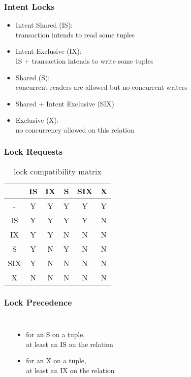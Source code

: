 \documentclass[dvipsnames]{beamer}
\theoremstyle{plain}
\begin{document}
\begin{frame}
  \frametitle{Intent Locks}

  \begin{itemize}
    \item Intent Shared (IS):\\
      transaction intends to read some tuples

    \item Intent Exclusive (IX):\\
      IS + transaction intends to write some tuples

    \item Shared (S):\\
      concurrent readers are allowed but no concurrent writers

    \item Shared + Intent Exclusive (SIX)

    \item Exclusive (X):\\
      no concurrency allowed on this relation
  \end{itemize}
\end{frame}

\begin{frame}
  \frametitle{Lock Requests}

  \begin{table}
    \caption{lock compatibility matrix}
    \begin{tabular}{|c||c|c|c|c|c|}\hline
    &  IS &  IX &   S & SIX &   X\\\hline\hline
  - &   Y &   Y &   Y &   Y &   Y\\\hline
 IS &   Y &   Y &   Y &   Y &   N\\\hline
 IX &   Y &   Y &   N &   N &   N\\\hline
  S &   Y &   N &   Y &   N &   N\\\hline
SIX &   Y &   N &   N &   N &   N\\\hline
  X &   N &   N &   N &   N &   N\\\hline
    \end{tabular}
  \end{table}
\end{frame}

\begin{frame}
  \frametitle{Lock Precedence}

  \begin{columns}[t]
    \begin{center}
    \end{center}

    \begin{itemize}
      \item for an S on a tuple,\\
	at least an IS on the relation
      \item for an X on a tuple,\\
	at least an IX on the relation
    \end{itemize}
  \end{columns}
\end{frame}
\end{document}
